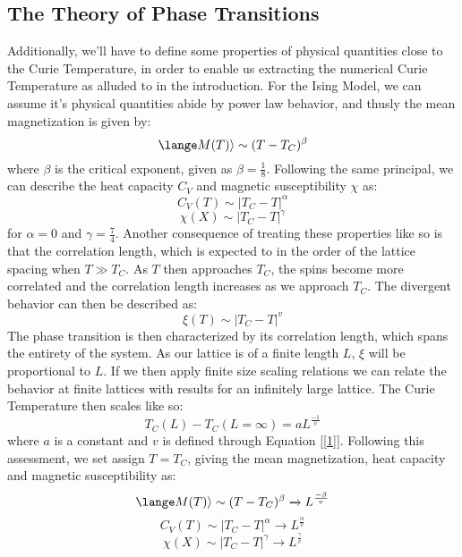 \documentclass{article}
\begin{document}
\subsection{The Theory of Phase Transitions}
Additionally, we'll have to define some properties of physical quantities close to the Curie Temperature, in order to enable us extracting the numerical Curie Temperature as alluded to in the introduction. \newline
For the Ising Model, we can assume it's physical quantities abide by power law behavior, and thusly the mean magnetization is given by:
\begin{equation*}
    \lange M(T)\rangle \sim (T - T_C)^\beta
\end{equation*}
where $\beta$ is the critical exponent, given as $\beta = \frac{1}{8}$.
\newline
Following the same principal, we can describe the heat capacity $C_V$ and magnetic susceptibility $\chi$ as:
\begin{equation*}
    C_V(T) \sim |T_C - T|^\alpha
\end{equation*}
\begin{equation*}
    \chi(X) \sim |T_C - T|^\gamma
\end{equation*}
for $\alpha = 0$ and $\gamma = \frac{7}{4}$. \newline
Another consequence of treating these properties like so is that the correlation length, which is expected to in the order of the lattice spacing when $T \gg T_C$. As $T$ then approaches $T_C$, the spins become more correlated and the correlation length increases as we approach $T_C$. \newline
The divergent behavior can then be described as:
\begin{equation} \label{1}
    \xi(T) \sim |T_C - T|^v
\end{equation}
The phase transition is then characterized by its correlation length, which spans the entirety of the system. As our lattice is of a finite length $L$, $\xi$ will be proportional to $L$. If we then apply finite size scaling relations we can relate the behavior at finite lattices with results for an infinitely large lattice. The Curie Temperature then scales like so:
\begin{equation}
    T_C(L) - T_C(L=\infty) = aL^{\frac{-1}{v}}
\end{equation}
where $a$ is a constant and $v$ is defined through Equation [\ref{1}].
\newline
Following this assessment, we set assign $T = T_C$, giving the mean magnetization, heat capacity and magnetic susceptibility as:
\begin{equation*}
    \lange M(T)\rangle \sim (T - T_C)^\beta \xrightarrow{} L^{\frac{-\beta}{v}}
\end{equation*}
\begin{equation*}
    C_V(T) \sim |T_C - T|^\alpha \xrightarrow{} L^{\frac{\alpha}{v}}
\end{equation*}
\begin{equation*}
    \chi(X) \sim |T_C - T|^\gamma \xrightarrow{} L^{\frac{\gamma}{v}}
\end{equation*}
\newpage
\end{document}
